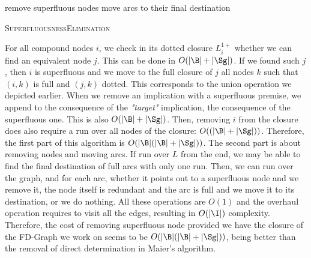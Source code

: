 \begin{algorithm}
	
	\BlankLine
	\BlankLine
	
	
	remove superfluous nodes \;
	move arcs to their final destination \;	
	
	\caption{\textsc{SuperfluousnessElimination}}
	\label{alg:Ausiello-Superfluous}
\end{algorithm}

For all compound nodes $i$, we check in its dotted closure $L_{i}^{1+}$ whether 
we can find an equivalent node $j$. This can be done in $O(|\B| + |\Sg|)$. If we found such $j$, then $i$ is superfluous and we move to the full closure of $j$ all nodes $k$ such that $(i, k)$ is full and $(j, k)$ dotted. This corresponds to the union operation we depicted earlier. When we remove an implication with a superfluous premise, we append to the consequence of the \textit{"target"} implication, the consequence of the superfluous one. This is also $O(|\B| + |\Sg|)$. Then, removing $i$ from the closure does also require a run over all nodes of the closure: $O((|\B| + |\Sg|))$. Therefore, the first part of this algorithm is $O(|\B|(|\B| + |\Sg|))$. The second part is about removing nodes and moving arcs. If run over $L$ from the end, we may be able to find the final destination of full arcs with only one run. Then, we can run over the graph, and for each arc, whether it points out to a superfluous node and we remove it, the node itself is redundant and the arc is full and we move it to its destination, or we do nothing. All these operations are $O(1)$ and the overhaul operation requires to visit all the edges, resulting in $O(|\I|)$ complexity. Therefore, the cost of removing superfluous node provided we have the closure of the FD-Graph we work on seems to be $O(|\B|(|\B| + |\Sg|))$, being better than the removal of direct determination in Maier's algorithm.

\vspace{1.2em}

